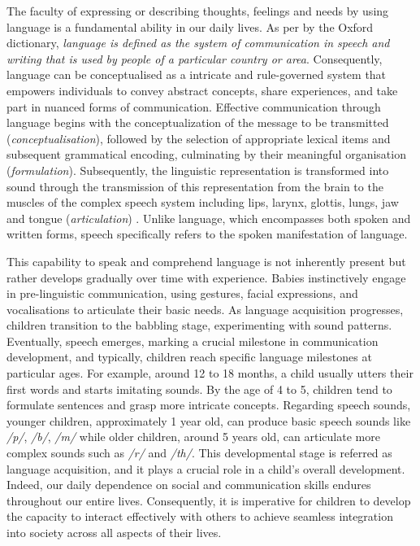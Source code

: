 \cleardoublepage
\label{chapter:1}
The faculty of expressing or describing thoughts, feelings and needs by using language is a fundamental ability in our daily lives. As per by the Oxford dictionary,  \textit{language is defined as the system of communication in speech and writing that is used by people of a particular country or area}. Consequently, language can be conceptualised as a intricate and rule-governed system that empowers individuals to convey abstract concepts, share experiences, and take part in nuanced forms of communication. Effective communication through language begins with the conceptualization of the message to be transmitted (\textit{conceptualisation}), followed by the selection of appropriate lexical items and subsequent grammatical encoding, culminating by their meaningful organisation (\textit{formulation}). Subsequently, the linguistic representation is transformed into sound through the transmission of this representation from the brain to the muscles of the complex speech system including lips, larynx, glottis, lungs, jaw and tongue (\textit{articulation}) \cite{levelt1993speaking}. Unlike language, which encompasses both spoken and written forms, speech specifically refers to the spoken manifestation of language.


This capability to speak and comprehend language is not inherently present but rather develops gradually over time with experience. Babies  instinctively engage in pre-linguistic communication, using gestures, facial expressions, and vocalisations to articulate their basic needs. As language acquisition progresses, children transition to the babbling stage, experimenting with sound patterns. Eventually, speech emerges, marking a crucial milestone in communication development, and typically, children reach specific language milestones at particular ages. For example, around 12 to 18 months, a child usually utters their first words and starts imitating sounds. By the age of 4 to 5, children tend to formulate sentences and grasp more intricate concepts. Regarding speech sounds, younger children, approximately 1 year old, can produce basic speech sounds like \textit{/p/}, \textit{/b/}, \textit{/m/} while older children, around 5 years old, can articulate more complex sounds such as \textit{/r/} and \textit{/th/}. This developmental stage is referred as language acquisition, and it plays a crucial role in a child's overall development. Indeed, our daily dependence on social and communication skills endures throughout our entire lives. Consequently, it is imperative for children to develop the capacity to interact effectively with others to achieve seamless integration into society across all aspects of their lives.

